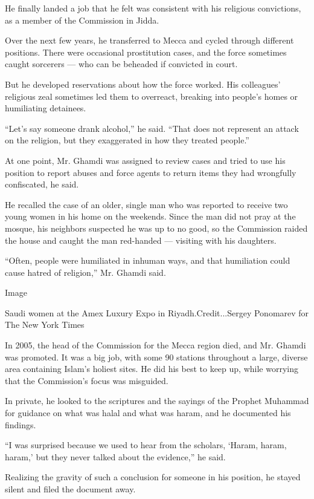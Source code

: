 He finally landed a job that he felt was consistent with his religious
convictions, as a member of the Commission in Jidda.

Over the next few years, he transferred to Mecca and cycled through
different positions. There were occasional prostitution cases, and the
force sometimes caught sorcerers --- who can be beheaded if convicted in
court.

But he developed reservations about how the force worked. His
colleagues' religious zeal sometimes led them to overreact, breaking
into people's homes or humiliating detainees.

``Let's say someone drank alcohol,'' he said. ``That does not represent
an attack on the religion, but they exaggerated in how they treated
people.''

At one point, Mr. Ghamdi was assigned to review cases and tried to use
his position to report abuses and force agents to return items they had
wrongfully confiscated, he said.

He recalled the case of an older, single man who was reported to receive
two young women in his home on the weekends. Since the man did not pray
at the mosque, his neighbors suspected he was up to no good, so the
Commission raided the house and caught the man red-handed --- visiting
with his daughters.

``Often, people were humiliated in inhuman ways, and that humiliation
could cause hatred of religion,'' Mr. Ghamdi said.

Image

Saudi women at the Amex Luxury Expo in Riyadh.Credit...Sergey Ponomarev
for The New York Times

In 2005, the head of the Commission for the Mecca region died, and Mr.
Ghamdi was promoted. It was a big job, with some 90 stations throughout
a large, diverse area containing Islam's holiest sites. He did his best
to keep up, while worrying that the Commission's focus was misguided.

In private, he looked to the scriptures and the sayings of the Prophet
Muhammad for guidance on what was halal and what was haram, and he
documented his findings.

``I was surprised because we used to hear from the scholars, `Haram,
haram, haram,' but they never talked about the evidence,'' he said.

Realizing the gravity of such a conclusion for someone in his position,
he stayed silent and filed the document away.

